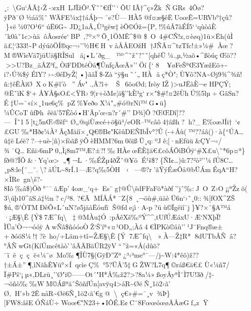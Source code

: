 ¸:\textbackslash Gu`ÂÃ‡‹Ž-:¢xH~LJÏžÕ².Ÿ˜˜€fÍ''\,`ÕU\textquotesingle IÃ†\^{}ç»ŽkÑGRs~4Ôø?ÿPð¯Ø½áå\%ˆWÄFE¼x‡†áÁþ¬
¯e?Ù---HÀ5@f¤æ§êËUoœÊ=URVb°†çû?\}«ë¼0?O¹6``úË6G\textasciitilde{}
JD­¿1aÂ„Ù³gëw‡èÔ©Óž=\{P‚!\%úÅ7à\textquotesingle ÉÍ5`\,`qùòåÈ´k0à˜1c\textgreater ùäôÂosré¢`BP~‚?º×ºÕ¸1ÖMÊ\^{}\$@\$~O~4\#CÑ!z‚¤èøq)1ü×Ë\textbar h(ûÌ
ä£¦`333!\textasciitilde PdýúõÖÍ®qc¬›''½H€H~våÅÅE\textquotesingle Ož\textquotesingle H†JÑÂ­¤\^{}tzTƒc!±»¼\#Åœ?M®WîeVä7jüUä§RÎSulä¡•L´ðg\_
\textquotesingle\textquotesingle ™`\^{}˜ž˜?˜˜{[}qhêÜ¼.,µ,½aõ•\^{}ßòúçŒö??\textgreater\textgreater U?Bz\_äÂZ³f„ÒïFDDtéÒå¶ÛnƒçÄœÄ»''Öí\{` 
8¥øFeŠªŒ3YæžEö+-i?›Ú¾\$ýÉlY?›\textasciitilde:0éDyŽ¦•\}ããÏ\$-Zà``ÿ§u˜´„HÀ
äç*Ò";Ù¥ô?NA\textasciitilde Øj9¾\^{}¾ñ!ñ:\textquotesingle†êÊÀïØ~XoK\#î'ò''Áv".‚Â?î+~Š~6õoØd;\textquotesingle IròyIŽ)\textgreater uJËàÈ¬e
HPÇÝ;
@Ë˜ìK\$`+Å¥Å§sO£\textless ŸR›9¦r+òMe\textquotesingle¦ä§''kÈ³g`r×"\$\#!¤2­­êÙhÚ \%5lµ÷GãSn?É‡U=¯«í×¸1ue6ç\%pZ\%¥eðo
X¼"„\#ó@rNi™G•ü\}¼ÛCoTûƒÞhêëã'57Êòó•H'Ãp'œ‹n?r´\#''D¾{]}Ô?ŒŒDî{]}??---Î˜15{]}t¿5nŒ‹®šf`` 
Ø„@qiÙæcé+ö§ü³/eOR--™câô4†âßh?h? \_Ë\%oæJÍi†~`¢£GU‰*Hð¢¼À²ÃçMäíí×¸Q€®B¢"KšûDEÑIbÎv°?Û(-+Åù(™??áâ()·à\{``ÚA\ldots û‡ëLéë??--+uè-¦ñ)×fòãßÿÕèHMM?6m0ôïßÜ¸q:ºJê;{[}·nEƒüü\textbar\&ÇY¬‹/¾¯Q\ldotsE ñi›6mP0,,Ì¡8m7™Æ?±?!‰HÀeœÊÈ‡ä€£cõÁÔìBÓÿ`\#X£u\textbackslash˜*6p¤ª\}ƒð@?ÏÕ\&·Yq'œ\textgreater­„¶­¬L·‰ÉŽµ4ðŽˆ@¥ö
É¹š\$?\{ÑI¢\ldots)û:7?²ò²''¼ƒÚ\textbar8C\ldots¸p8:le\{¨\_¨.\textbackslash?åÚL\textasciitilde8rÍ.1---Æ?q‰5ÒH
‹---®?r'ãŸýÉæÔå@bÜÁmÉqA``H?×ÌRegn\textbackslash š?­8Iô‰â\$)Öð°¯¯ãÆp'4oæ\_`q+~Es¨g†@Û\textbackslash š dFFaFõ*àðf''jˆ‰:J~O~Z›O¡¡ªŽzõ(3\textbackslash úþ10\^{}ãS.å‡½n?c/³8.
?€Ã MÍÅÁ*¯Z\{8­~¸¬öù\#‚üàèÜ6n`›˜¸0::¾{[}fOX\^{}ZŠ
\$ú‚®'ÒTMÐ\textbar êÕ«L´uN?ø5jäåËóufï Š@fde¡ì·A-p?üù©Ïgëïí¯j\}¥?×¨§A™á
·¡Æ§\textbackslash Ê\{Ý\$7Æ\^{}fq\textbackslash
‡@MÀu‡Ó~:pÂêXš‰ºÝ\^{}\^{}‚tUƒÚÆáxU·Æ`NXþÏ!ÌÜa'Ò¬¬óóÿAwÑâ\$ñóóoÒŽ`Š'íª«¤¹OD„;Àâ4€ÌPKò©åù''¹J¨Fnq®æ±+ðóöS¼!†?è~ho/÷Läm+tî=ŽÆ§\textbackslash Ê\{Ý7Æ\^{}fq\textbackslash
»À---Ž‡R*8dUTbÂÑâ?°ÂÑwGt(KíÚmcêtàò'\,'âÄÄBäÚR2ÿV``\,''ž=«Å(dûõ?¯ïëççë«¼¨øMo‰¶ÎÙ7§(GÿÐ''Zª¿³‹³me°¯---/j\textasciitilde W:4*êô)ž??†±Á±''¶‚ìNãh\textbar Ê¥ü°×Í~qcìeÇ\%°5?ÜÂ'5‡GŽW?L7q¶©ráß€ä€£Ù«¼ñ7/Ï\#Pš`¡µ«‚D­Lrü¸''Ø"i©------Ot´"H*Å‰ž2?\textgreater?8a¼»ßoyÅyªÌ¨Ì7U!3ð/‡­¬öñò‰‰WM©ÁßªäˆŠõñfÚn{[}avÿq4\textgreater åR\textasciitilde ØëÑ¸1ö2‹ã' 
Ø‚ H'»b2ÊnåR\textasciitilde Øë6Ñ¸1ö2‹ã'€g@\textbackslashç€»\#=¯¸v¾Þ\}{[}FW8:âšEÓÑáÙ÷Woœ€"N23+•IÕÉ.E¢C¨8FœœóœøÄÅæGf„z\textquotesingleŸ
